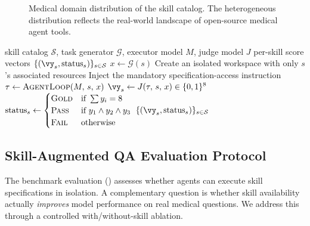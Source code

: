 \begin{figure}[t]
\caption{Medical domain distribution of the \medskillbench skill catalog. The heterogeneous distribution reflects the real-world landscape of open-source medical agent tools.}
\label{fig:domain_dist}
\end{figure}

\begin{algorithm}[t]
\caption{\medskillbench Evaluation Pipeline}
\label{alg:eval_pipeline}
\begin{algorithmic}[1]
\Require skill catalog $\mathcal{S}$, task generator $\mathcal{G}$, executor model $M$, judge model $J$
\Ensure per-skill score vectors $\{(\vy_s, \text{status}_s)\}_{s \in \mathcal{S}}$
    \State $x \gets \mathcal{G}(s)$ 
    \State Create an isolated workspace with only $s$'s associated resources
    \State Inject the mandatory specification-access instruction
    \State $\tau \gets \textsc{AgentLoop}(M,\, s,\, x)$ 
    \State $\vy_s \gets J(\tau,\, s,\, x) \in \{0,1\}^8$ 
    \State $\text{status}_s \gets \begin{cases} \textsc{Gold} & \text{if } \sum y_i = 8 \\ \textsc{Pass} & \text{if } y_1 \wedge y_2 \wedge y_3 \\ \textsc{Fail} & \text{otherwise} \end{cases}$
\EndFor
\State \Return $\{(\vy_s, \text{status}_s)\}_{s \in \mathcal{S}}$
\end{algorithmic}
\end{algorithm}


\subsection{Skill-Augmented QA Evaluation Protocol}
\label{subsec:ablation_protocol}

The benchmark evaluation () assesses whether agents can execute skill specifications in isolation.
A complementary question is whether skill availability actually \emph{improves} model performance on real medical questions.
We address this through a controlled with/without-skill ablation.


